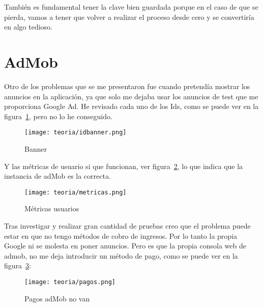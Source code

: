 También es fundamental tener la clave bien guardada porque en el caso de que se pierda, vamos a tener que volver a realizar el proceso desde cero y se convertiría en algo tedioso.

\section{AdMob}
Otro de los problemas que se me presentaron fue cuando pretendía mostrar los anuncios en la aplicación, ya que solo me dejaba usar los anuncios de test que me proporciona Google Ad. He revisado cada uno de los Ids, como se puede ver en la figura~\ref{fig:idbanner}, pero no lo he conseguido.

\begin{figure}[H]
	\centering
	\texttt{[image: teoria/idbanner.png]}
	\caption{Banner}\label{fig:idbanner}
\end{figure}

Y las métricas de usuario si que funcionan, ver figura~\ref{fig:metricas}, lo que indica que la instancia de adMob es la correcta.

\begin{figure}[H]
	\centering
	\texttt{[image: teoria/metricas.png]}
	\caption{Métricas usuarios}\label{fig:metricas}
\end{figure}

Tras investigar y realizar gran cantidad de pruebas creo que el problema puede estar en que no tengo métodos de cobro de ingresos. Por lo tanto la propia Google ni se molesta en poner anuncios. Pero es que la propia consola web de admob, no me deja introducir un método de pago, como se puede ver en la figura~\ref{fig:pagos}:

\begin{figure}[H]
	\centering
	\texttt{[image: teoria/pagos.png]}
	\caption{Pagos adMob no van}\label{fig:pagos}
\end{figure}



